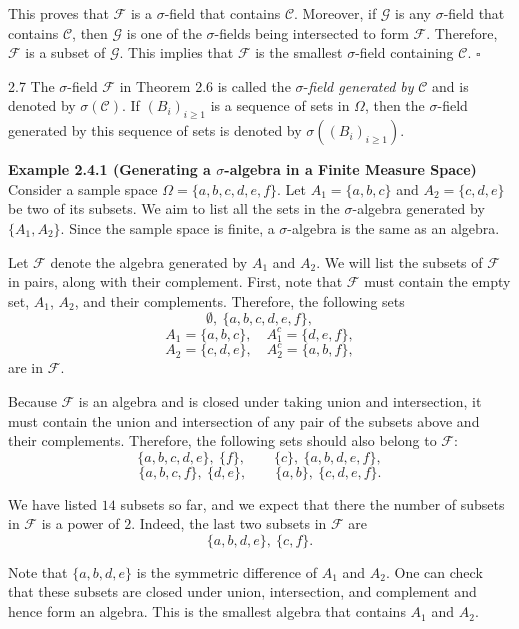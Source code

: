 This proves that $\mathcal{F}$ is a $\sigma$-field that contains $\mathcal{C}$. Moreover, if $\mathcal{G}$ is any $\sigma$-field that contains $\mathcal{C}$, then $\mathcal{G}$ is one of the $\sigma$-fields being intersected to form $\mathcal{F}$. Therefore, $\mathcal{F}$ is a subset of $\mathcal{G}$. This implies that $\mathcal{F}$ is the smallest $\sigma$-field containing $\mathcal{C}$. \hfill $\square$

\begin{defbox}{2.7}
The $\sigma$-field $\mathcal{F}$ in Theorem 2.6 is called the $\sigma$-\textit{field generated by} $\mathcal{C}$ and is denoted by $\sigma(\mathcal{C})$. If $(B_i)_{i\ge 1}$ is a sequence of sets in $\Omega$, then the $\sigma$-field generated by this sequence of sets is denoted by $\sigma((B_i)_{i\ge 1})$.
\end{defbox}

\textbf{Example 2.4.1 (Generating a $\sigma$-algebra in a Finite Measure Space)} \\
Consider a sample space $\Omega=\{a,b,c,d,e,f\}$. Let $A_1=\{a,b,c\}$ and $A_2=\{c,d,e\}$ be two of its subsets. We aim to list all the sets in the $\sigma$-algebra generated by $\{A_1,A_2\}$. Since the sample space is finite, a $\sigma$-algebra is the same as an algebra.

Let $\mathcal{F}$ denote the algebra generated by $A_1$ and $A_2$. We will list the subsets of $\mathcal{F}$ in pairs, along with their complement. First, note that $\mathcal{F}$ must contain the empty set, $A_1$, $A_2$, and their complements. Therefore, the following sets
\[
\emptyset,\ \{a,b,c,d,e,f\},
\]
\[
A_1=\{a,b,c\}, \quad A_1^c=\{d,e,f\},
\]
\[
A_2=\{c,d,e\}, \quad A_2^c=\{a,b,f\},
\]
are in $\mathcal{F}$.

Because $\mathcal{F}$ is an algebra and is closed under taking union and intersection, it must contain the union and intersection of any pair of the subsets above and their complements. Therefore, the following sets should also belong to $\mathcal{F}$:
\[
\{a,b,c,d,e\},\ \{f\}, \qquad \{c\},\ \{a,b,d,e,f\},
\]
\[
\{a,b,c,f\},\ \{d,e\}, \qquad \{a,b\},\ \{c,d,e,f\}.
\]

We have listed $14$ subsets so far, and we expect that there the number of subsets in $\mathcal{F}$ is a power of $2$. Indeed, the last two subsets in $\mathcal{F}$ are
\[
\{a,b,d,e\},\ \{c,f\}.
\]

Note that $\{a,b,d,e\}$ is the symmetric difference of $A_1$ and $A_2$. One can check that these subsets are closed under union, intersection, and complement and hence form an algebra. This is the smallest algebra that contains $A_1$ and $A_2$.

